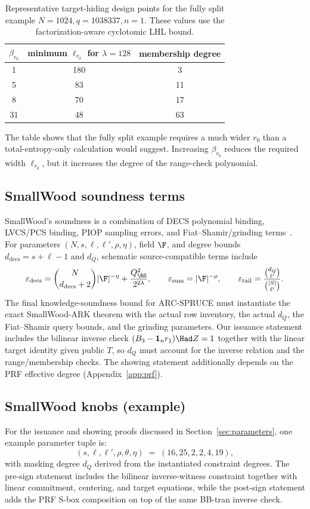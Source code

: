 \begin{table}[H]
\centering
\renewcommand{\arraystretch}{1.15}
\begin{tabular}{@{}ccc@{}}
\toprule
\(\beta_{r_0}\) & minimum \(\ell_{r_0}\) for \(\lambda=128\) & membership degree \\
\midrule
1  & 180 & 3  \\
5  & 83  & 11 \\
8  & 70  & 17 \\
31 & 48  & 63 \\
\bottomrule
\end{tabular}
\caption{Representative target-hiding design points for the fully split example
\(N=1024,q=1038337,n=1\).  These values use the factorization-aware cyclotomic LHL bound.}
\label{tab:lhl-design-points}
\end{table}

The table shows that the fully split example requires a much wider \(r_0\) than a total-entropy-only
calculation would suggest.  Increasing \(\beta_{r_0}\) reduces the required width \(\ell_{r_0}\), but it increases
the degree of the range-check polynomial.

\subsection{SmallWood soundness terms}
SmallWood’s soundness is a combination of DECS polynomial binding, LVCS/PCS binding, PIOP sampling errors,
and Fiat--Shamir/grinding terms~\cite{EPRINT:FenRiv25b}.  For parameters
\((N,s,\ell,\ell',\rho,\eta)\), field \(\F\), and degree bounds \(d_{\mathrm{decs}}=s+\ell-1\) and \(d_Q\),
schematic source-compatible terms include
\[
\varepsilon_{\mathrm{decs}}
=
\binom{N}{d_{\mathrm{decs}}+2}|\F|^{-\eta}
+
\frac{Q_{\RO}^2}{2^{2\lambda}},
\qquad
\varepsilon_{\mathrm{sum}} = |\F|^{-\rho},
\qquad
\varepsilon_{\mathrm{tail}} =
\frac{\binom{d_Q}{\ell'}}{\binom{|S|}{\ell'}}.
\]
The final knowledge-soundness bound for ARC-SPRUCE must instantiate the exact SmallWood-ARK theorem with
the actual row inventory, the actual \(d_Q\), the Fiat--Shamir query bounds, and the grinding parameters.
Our issuance statement includes the bilinear inverse check \((B_3-\mathbf 1_n r_1)\Had Z=1\) together with
the linear target identity given public \(T\), so \(d_Q\) must account for the inverse relation and the
range/membership checks.  The showing statement additionally depends on the PRF effective degree
(Appendix~\ref{app:prf}).

\subsection{SmallWood knobs (example)}
For the issuance and showing proofs discussed in Section~\ref{sec:parameters}, one example parameter tuple is:
\[
  (s,\ell,\ell',\rho,\theta,\eta)\;=\;(16,25,2,2,4,19),
\]
with masking degree \(d_Q\) derived from the instantiated constraint degrees. The pre-sign statement includes the bilinear inverse-witness constraint together with linear commitment, centering, and target equations, while the post-sign statement adds the PRF S-box composition on top of the same BB-tran inverse check.

